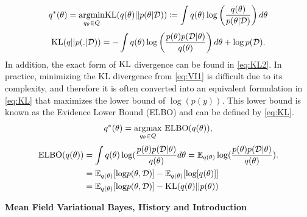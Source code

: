 \begin{equation}
	\label{eq:VI1}
	q^{*}(\theta) = \underset{q_{\theta} \in Q}{\operatorname{argmin}} \textnormal{KL}(q(\theta)||p(\theta|\mathcal{D})) \coloneqq \int q(\theta)\log\left(\frac{q(\theta)}{p(\theta|\mathcal{D})}\right)d\theta
\end{equation}
\begin{equation}
	\label{eq:KL2}
	\textnormal{KL}(q||p(.|\mathcal{D})) = - \int q(\theta)\log\left(\frac{p(\theta)p(\mathcal{D}|\theta)}{q(\theta)}\right) d\theta + \log p(\mathcal{D}).
\end{equation}
In addition, the exact form of $\textnormal{KL}$ divergence can be found in \autoref{eq:KL2}.
In practice, minimizing the KL divergence from \autoref{eq:VI1} is difficult due to its complexity, and therefore it is often converted into an equivalent formulation in \autoref{eq:KL} that maximizes the lower bound of $\log(p(y))$. This lower bound is known as the Evidence Lower Bound (ELBO) and can be defined by \autoref{eq:KL}.
\begin{equation}
	\label{eq:KL}
	q^*(\theta) = \underset{q_{\theta} \in Q}{\operatorname{ argmax}} \textnormal{ ELBO}(q(\theta)),
\end{equation}
\begin{equation}
	\label{eq:ELBO}	
	\begin{aligned}
		\textnormal{ELBO}(q(\theta)) &= \int q(\theta)\log(\frac{p(\theta)p(\mathcal{D}|\theta)}{q(\theta)}d\theta = \mathop{\mathbb{E}_{q(\theta)}}\log(\frac{p(\theta)p(\mathcal{D}|\theta)}{q(\theta)}).\\
		& = \mathop{\mathbb{E}_{q(\theta)}}[\textnormal{log}p(\theta,\mathcal{D})]
		- \mathop{\mathbb{E}_{q(\theta)}}[\textnormal{log}[q(\theta)]]\\
		&= \mathop{\mathbb{E}_{q(\theta)}}[\textnormal{log}p(\theta,\mathcal{D})]
		- \textnormal{KL}(q(\theta)||p(\theta))\\
	\end{aligned}
\end{equation}

\textbf{Mean Field Variational Bayes, History and Introduction}

